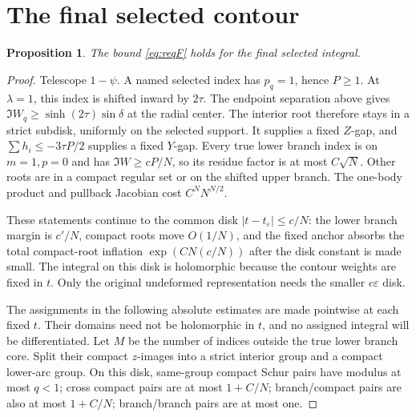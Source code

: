 \documentclass[11pt]{article}
\numberwithin{equation}{section}
\newtheorem{proposition}[theorem]{Proposition}
\theoremstyle{definition}
\newcommand{\eps}{\varepsilon}
\newcommand{\se}{t_\varepsilon}
\begin{document}
\section{The final selected contour}
\label{sec:F}
\begin{proposition}\label{prop:F}
The bound \eqref{eq:reqF} holds for the final selected integral.
\end{proposition}
\begin{proof}
Telescope \(1-\psi\). A named selected index has \(p_q=1\), hence \(P\ge1\).
At \(\lambda=1\), this index is shifted inward by \(2\tau\).
The endpoint separation above gives
\(\Im W_q\ge\sinh(2\tau)\sin\delta\) at the radial center.
The interior root therefore stays in a strict subdisk, uniformly
on the selected support. It supplies a fixed \(Z\)-gap, and
\(\sum h_i\le-3\tau P/2\) supplies a fixed \(Y\)-gap.
Every true lower branch index is on \(m=1,p=0\) and has
\(\Im W\ge cP/N\), so its residue factor is at most \(C\sqrt N\).
Other roots are in a compact regular set or on the shifted upper
branch. The one-body product and pullback Jacobian cost
\(C^N N^{N/2}\).

These statements continue to the common disk \(|t-\se|\le c/N\):
the lower branch margin is \(c'/N\), compact roots move \(O(1/N)\),
and the fixed anchor absorbs the total compact-root inflation
\(\exp(CN(c/N))\) after the disk constant is made small.
The integral on this disk is holomorphic because the contour weights
are fixed in \(t\). Only the original undeformed representation needs
the smaller \(c\eps\) disk.

The assignments in the following absolute estimates are made
pointwise at each fixed \(t\). Their domains need not be holomorphic
in \(t\), and no assigned integral will be differentiated.
Let \(M\) be the number of indices outside the true lower branch core.
Split their compact \(z\)-images into a strict interior group and a
compact lower-arc group. On this disk, same-group compact Schur
pairs have modulus at most \(q<1\); cross compact pairs are at most
\(1+C/N\); branch/compact pairs are also at most \(1+C/N\);
branch/branch pairs are at most one.


\end{proof}
\end{document}
